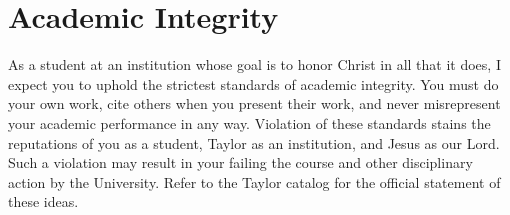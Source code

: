 \documentclass{article}
\begin{document}
\section{Academic Integrity}
\label{sec:orgheadline13}
As a student at an institution whose goal is to honor Christ in all that it does,
I expect you to uphold the strictest standards of academic integrity.
You must do your own work, cite others when you present their work,
and never misrepresent your academic performance in any way.
Violation of these standards stains the reputations of you as a student,
Taylor as an institution,
and Jesus as our Lord.
Such a violation may result in your failing the course
and other disciplinary action by the University.
Refer to the Taylor catalog for the official statement of these ideas.
\end{document}
